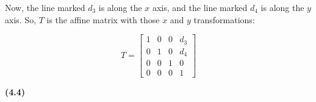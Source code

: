\documentclass[letterpaper, 11pt]{article}
\begin{document}
Now, the line marked $d_3$ is along the $x$ axis, and the line marked $d_4$ is along the $y$ axis. So, $T$ is the affine matrix with those $x$ and $y$ transformations:

$$T = \begin{bmatrix}
  1 & 0 & 0 & d_3 \\
  0 & 1 & 0 & d_4 \\ 
  0 & 0 & 1 & 0 \\ 
  0 & 0 & 0 & 1
\end{bmatrix}$$

\newpage
\noindent \textbf{(4.4)} \\
\end{document}
